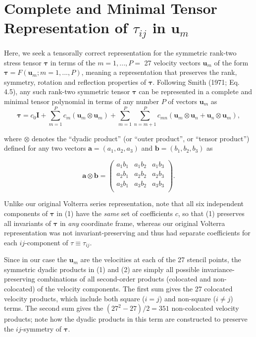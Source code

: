 \section{Complete and Minimal Tensor Representation of $\tau_{ij}$  in $\mathbf{u}_{m}$ } 

Here, we seek a tensorally correct representation for the symmetric rank-two stress tensor  $\mathbf{\tau}$ in terms of the $m = 1, ..., P = $ 27 velocity vectors $\mathbf{u}_{m}$ of the form  $\mathbf{\tau} = F (\mathbf{u}_{m}; m = 1, ..., P)$, meaning a representation that preserves the rank, symmetry, rotation and reflection properties of $\mathbf{\tau}$.  Following Smith (1971; Eq. 4.5), any such rank-two symmetric tensor $\mathbf{\tau}$  can be represented in a complete and minimal tensor polynomial in terms of any number $P$ of vectors  $\mathbf{u}_{m}$  as
%
\begin{equation}
	\label{E:14}
	\mathbf{\tau} = c_0 \mathbf{I} + \sum_{m=1}^{P} c_m (\mathbf{u}_m \otimes \mathbf{u}_m)
	+ \sum_{m=1}^{P} \sum_{n=m+1}^{P} c_{mn} (\mathbf{u}_m \otimes \mathbf{u}_n +
	\mathbf{u}_n \otimes \mathbf{u}_m), 
\end{equation}
%
%        

where $\otimes$  denotes the ``dyadic product'' (or ``outer product'', or ``tensor product'') defined for any two vectors $\mathbf{a} = (a_1, a_2, a_3)$  and $\mathbf{b} = (b_1, b_2, b_3)$  as

%
\begin{equation}
	\label{E:15}
	\mathbf{a \otimes b} = 
	\begin{pmatrix}
		a_1b_1 & a_1 b_2 & a_1b_3 \\
		a_2b_1 & a_2 b_2 & a_2b_3 \\
		a_3b_1 & a_3 b_2 & a_3b_3 \\
	\end{pmatrix}.
\end{equation}
%
%        

Unlike our original Volterra series representation, note that all six independent components of $\mathbf{\tau}$ in (1) have the \textit{same} set of coefficients $c$, so that (1) preserves all invariants of  $\mathbf{\tau}$ in \textit{any} coordinate frame, whereas our original Volterra representation was not invariant-preserving and thus had separate coefficients for each $ij$-component of $\tau \equiv \tau_{ij}$.

Since in our case the $\mathbf{u}_{m}$  are the velocities at each of the 27 stencil points, the symmetric dyadic products in (1) and (2) are simply all possible invariance-preserving combinations of all second-order products (colocated and non-colocated) of the velocity components.  The first sum gives the 27 colocated velocity products, which include both square ($i = j$) and non-square ($i \neq j$)  terms. The second sum gives the $({27}^2 - 27)/2 = 351$  non-colocated velocity products; note how the dyadic products in this term are constructed to preserve the $ij$-symmetry of $\mathbf{\tau}$.

